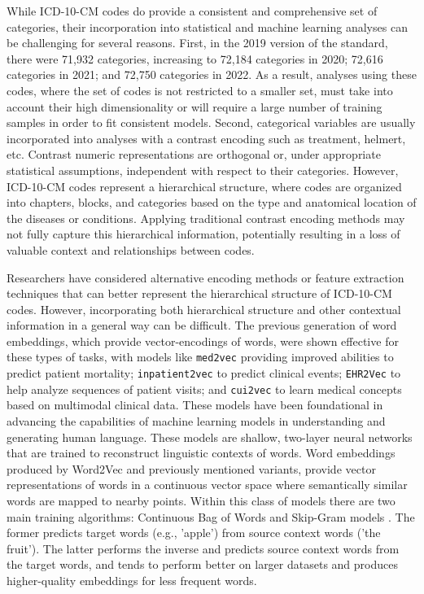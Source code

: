 \documentclass{bmcart}
\begin{document}
While ICD-10-CM codes do provide a consistent and comprehensive set of 
categories, their incorporation into statistical and machine learning analyses 
can be challenging for several reasons. First, in the 2019 version of the 
standard, there were 71,932 categories, increasing to 72,184 categories in 
2020; 72,616 categories in 2021; and 72,750 categories in 2022. As a result, 
analyses using these codes, where the set of codes is not restricted to a smaller 
set, 
must take into account their high dimensionality or will require a large 
number of training samples in order to fit consistent models. Second, 
categorical variables are usually incorporated into analyses with a contrast 
encoding such as treatment, helmert, etc. Contrast numeric 
representations are orthogonal or, under appropriate statistical assumptions, 
independent with respect to their categories. However, ICD-10-CM codes 
represent a hierarchical structure, 
where codes are organized into chapters, blocks, and categories based on the 
type and anatomical location of the diseases or conditions. Applying 
traditional contrast encoding methods may 
not fully capture this hierarchical information, potentially resulting in a 
loss of valuable context and relationships between codes.

Researchers have considered alternative encoding methods or feature extraction 
techniques that can better represent the hierarchical structure of ICD-10-CM 
codes. However, incorporating both hierarchical structure and other contextual 
information in a general way can be difficult. The previous generation of word 
embeddings, which provide vector-encodings of words, were shown effective for 
these types of tasks, with models like \texttt{med2vec} \cite{med2vec} 
providing improved abilities to predict patient mortality; 
\texttt{inpatient2vec} \cite{inpatient2vec} to predict clinical events; 
\texttt{EHR2Vec} \cite{ehr2vec} to help analyze sequences of patient 
visits; and \texttt{cui2vec} \cite{cui2vec} to learn medical concepts based on multimodal
clinical data. These models have been foundational in advancing the capabilities of machine learning models in understanding and generating human language. 
These models are shallow, two-layer neural networks that are trained to reconstruct linguistic contexts of words. Word embeddings produced by Word2Vec \cite{church2017} and
previously mentioned variants, provide vector representations of words in a continuous vector space where semantically similar words are mapped to nearby points.
Within this class of models there are two main training algorithms: Continuous Bag of Words and Skip-Gram models \cite{mikolov2013}. The former predicts target words 
(e.g., 'apple') from source context words ('the fruit'). The latter performs
the inverse and predicts source context words from the target words, and
tends to perform better on larger datasets and produces higher-quality embeddings for less frequent words.
\end{document}
